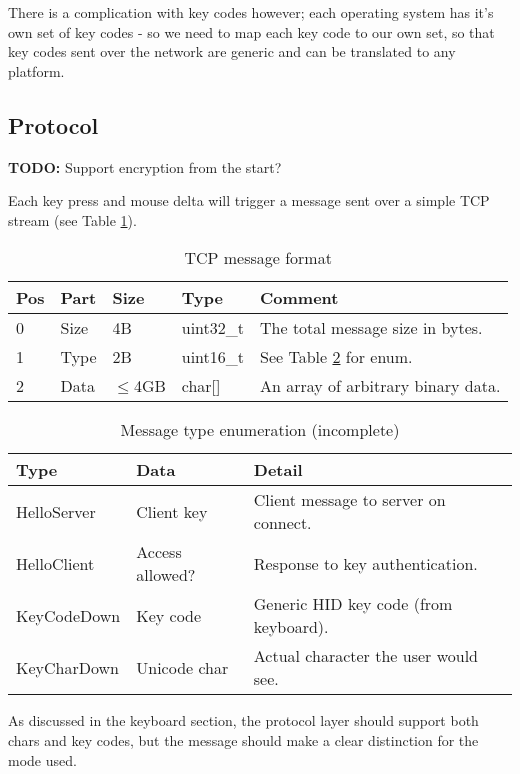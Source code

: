 There is a complication with key codes however; each operating system has it's
own set of key codes - so we need to map each key code to our own set, so that
key codes sent over the network are generic and can be translated to any 
platform.

\subsection{Protocol}

\textbf{TODO:} Support encryption from the start?

Each key press and mouse delta will trigger a message sent over a simple TCP 
stream (see Table \ref{tab:messageFormat}).

\begin{table}
  \begin{tabular}{|l|l|l|l|l|}
    \hline
    \textbf{Pos} &
    \textbf{Part} &
    \textbf{Size} &
    \textbf{Type} &
    \textbf{Comment} \\
    \hline
    0 & Size & 4B & uint32\_t & The total message size in bytes. \\
    1 & Type & 2B & uint16\_t & See Table \ref{tab:messageTypes} for enum. \\
    2 & Data & $\leq$4GB & char[] & An array of arbitrary binary data. \\
    \hline
  \end{tabular}
  \caption{TCP message format}
  \label{tab:messageFormat}
\end{table}

\begin{table}
  \begin{tabular}{|l|l|l|}
    \hline
    \textbf{Type} &
    \textbf{Data} &
    \textbf{Detail} \\
    \hline
    HelloServer & Client key & Client message to server on connect. \\
    HelloClient & Access allowed? & Response to key authentication. \\
    KeyCodeDown & Key code & Generic HID key code (from keyboard). \\
    KeyCharDown & Unicode char & Actual character the user would see. \\
    \hline
  \end{tabular}
  \caption{Message type enumeration (incomplete)}
  \label{tab:messageTypes}
\end{table}

As discussed in the keyboard section, the protocol layer should support both
chars and key codes, but the message should make a clear distinction for the
mode used.

